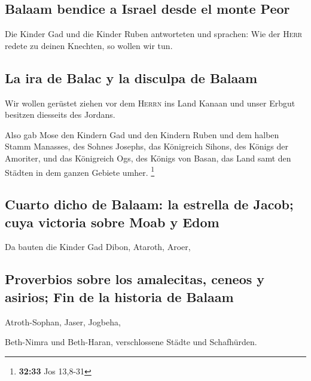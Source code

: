 \hypertarget{balaam-bendice-a-israel-desde-el-monte-peor}{%
\subsection{Balaam bendice a Israel desde el monte
Peor}\label{balaam-bendice-a-israel-desde-el-monte-peor}}

 Die Kinder Gad und die Kinder Ruben antworteten und
sprachen: Wie der \textsc{Herr} redete zu deinen Knechten, so wollen wir
tun.

\hypertarget{la-ira-de-balac-y-la-disculpa-de-balaam}{%
\subsection{La ira de Balac y la disculpa de
Balaam}\label{la-ira-de-balac-y-la-disculpa-de-balaam}}

 Wir wollen gerüstet ziehen vor dem \textsc{Herrn} ins
Land Kanaan und unser Erbgut besitzen diesseits des Jordans.

 Also gab Mose den Kindern Gad und den Kindern Ruben und
dem halben Stamm Manasses, des Sohnes Josephs, das Königreich Sihons,
des Königs der Amoriter, und das Königreich Ogs, des Königs von Basan,
das Land samt den Städten in dem ganzen Gebiete umher. \footnote{\textbf{32:33}
  Jos 13,8-31}

\hypertarget{cuarto-dicho-de-balaam-la-estrella-de-jacob-cuya-victoria-sobre-moab-y-edom}{%
\subsection{Cuarto dicho de Balaam: la estrella de Jacob; cuya victoria
sobre Moab y
Edom}\label{cuarto-dicho-de-balaam-la-estrella-de-jacob-cuya-victoria-sobre-moab-y-edom}}

 Da bauten die Kinder Gad Dibon, Ataroth, Aroer,

\hypertarget{proverbios-sobre-los-amalecitas-ceneos-y-asirios-fin-de-la-historia-de-balaam}{%
\subsection{Proverbios sobre los amalecitas, ceneos y asirios; Fin de la
historia de
Balaam}\label{proverbios-sobre-los-amalecitas-ceneos-y-asirios-fin-de-la-historia-de-balaam}}

 Atroth-Sophan, Jaser, Jogbeha,

 Beth-Nimra und Beth-Haran, verschlossene Städte und
Schafhürden.


